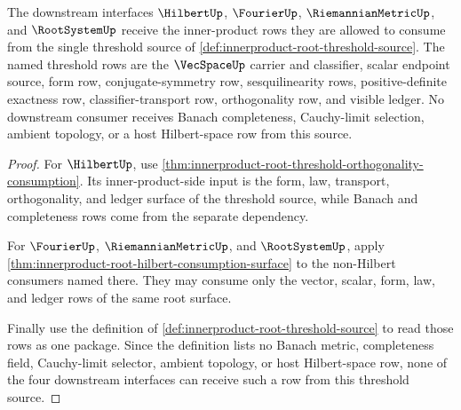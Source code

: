 \begin{theorem}
\label{thm:innerproduct-root-threshold-downstream-coverage}
The downstream interfaces $\HilbertUp$, $\FourierUp$,
$\RiemannianMetricUp$, and $\RootSystemUp$ receive the inner-product rows
they are allowed to consume from the single threshold source of
\autoref{def:innerproduct-root-threshold-source}. The named threshold rows
are the $\VecSpaceUp$ carrier and classifier, scalar endpoint source, form
row, conjugate-symmetry row, sesquilinearity rows, positive-definite
exactness row, classifier-transport row, orthogonality row, and visible
ledger. No downstream consumer receives Banach completeness, Cauchy-limit
selection, ambient topology, or a host Hilbert-space row from this source.
\end{theorem}
\begin{proof}
For $\HilbertUp$, use
\autoref{thm:innerproduct-root-threshold-orthogonality-consumption}. Its
inner-product-side input is the form, law, transport, orthogonality, and
ledger surface of the threshold source, while Banach and completeness rows
come from the separate dependency.

For $\FourierUp$, $\RiemannianMetricUp$, and $\RootSystemUp$, apply
\autoref{thm:innerproduct-root-hilbert-consumption-surface} to the
non-Hilbert consumers named there. They may consume only the vector, scalar,
form, law, and ledger rows of the same root surface.

Finally use the definition of
\autoref{def:innerproduct-root-threshold-source} to read those rows as one
package. Since the definition lists no Banach metric, completeness field,
Cauchy-limit selector, ambient topology, or host Hilbert-space row, none of
the four downstream interfaces can receive such a row from this threshold
source.
\end{proof}
